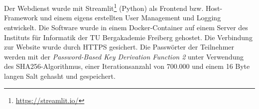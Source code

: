 \\\\
Der Webdienst wurde mit Streamlit\footnote{\href{https://streamlit.io/}{https://streamlit.io/}} (Python) als Frontend bzw. Host-Framework und 
einem eigens erstellten User Management und Logging entwickelt. Die Software wurde 
in einem Docker-Container auf einem Server des Instituts für Informatik der TU 
Bergakademie Freiberg gehostet. Die Verbindung zur Website wurde durch HTTPS 
gesichert. Die Passwörter der Teilnehmer werden mit der \textit{Password-Based Key 
Derivation Function 2} unter Verwendung des SHA256-Algorithmus, einer 
Iterationsanzahl von $700.000$ und einem 16 Byte langen Salt gehasht und 
gespeichert.